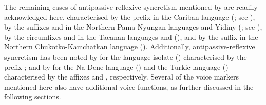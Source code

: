 The remaining cases of antipassive-reflexive syncretism mentioned by \citet{janic:2010} are readily acknowledged here, characterised by the prefix  in the Cariban language  (; see \citealt{gildea:al:2016}),  by the suffixes  and  in the Northern Pama-Nyungan languages  and Yidiny (; see \citealt{terrill:1997}), by the circumfixes  and  in the Tacanan languages  and  (), and by the suffix  in the Northern Chukotko-Kamchatkan language  (). Additionally, antipassive-reflexive syncretism has been noted by \citet[75ff.]{vigus:2016} for the language isolate  () characterised by the prefix ; and by \citet[193ff.]{sanso:2017} for the Na-Dene language  () and the Turkic language  () characterised by the affixes  and , respectively. Several of the voice markers mentioned here also have additional voice functions, as further discussed in the following sections.

